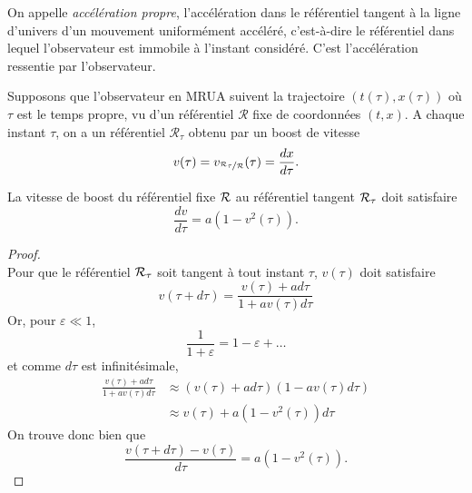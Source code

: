 \documentclass[a4paper,11pt]{report}
\begin{document}
            \begin{defn}
                On appelle \textit{accélération propre}, l'accélération dans le référentiel tangent à la ligne d'univers d'un mouvement uniformément accéléré, c'est-à-dire le référentiel dans lequel l'observateur est immobile à l'instant considéré. C'est l'accélération ressentie par l'observateur.
            \end{defn}
            
            Supposons que l'observateur en MRUA suivent la trajectoire $(t(\tau),x(\tau))$ où $\tau$ est le temps propre, vu d'un référentiel $\mathcal{R}$ fixe de coordonnées $(t,x)$. A chaque instant $\tau$, on a un référentiel $\mathcal{R}_{\tau}$ obtenu par un boost de vitesse
            \begin{equation}
                v(\tau) = v_{\nicefrac{\mathcal{R}_\tau}{\mathcal{R}}}(\tau) = \frac{dx}{d\tau}.
            \end{equation}
            
            \begin{prop}\begin{leftbar}\label{prop:v}
                La vitesse de boost du référentiel fixe $\mathcal{R}$ au référentiel tangent $\mathcal{R}_\tau$ doit satisfaire
                \begin{equation}
                    \frac{dv}{d\tau} = a\left(1-v^2(\tau)\right).
                \end{equation}
            \end{leftbar}\end{prop}
            
            \begin{proof}
            ${}$\\
                Pour que le référentiel $\mathcal{R}_\tau$ soit tangent à tout instant $\tau$, $v(\tau)$ doit satisfaire
            \begin{equation}
                v(\tau+d\tau) = \frac{v(\tau)+ad\tau}{1+av(\tau)d\tau}
            \end{equation}
            Or, pour $\varepsilon\ll 1$,
            \begin{equation}
                \frac{1}{1+\varepsilon} = 1-\varepsilon+\dots
            \end{equation}
            et comme $d\tau$ est infinitésimale,
            \begin{align}
                \frac{v(\tau)+ad\tau}{1+av(\tau)d\tau} &\approx \left(v(\tau)+ad\tau\right)\left( 1-av(\tau)d\tau \right) \\
                &\approx v(\tau) + a\left( 1-v^2(\tau) \right)d\tau
            \end{align}
            On trouve donc bien que 
            \begin{equation}
                \frac{v(\tau+d\tau)-v(\tau)}{d\tau} = a\left( 1-v^2(\tau) \right).
            \end{equation}
            \end{proof}
            
\end{document}

